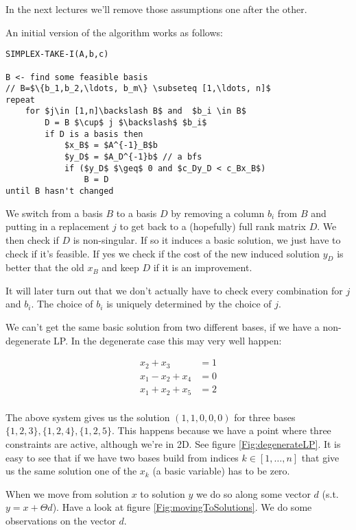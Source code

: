 In the next lectures we'll remove those assumptions one after the other.

An initial version of the algorithm works as follows:
\begin{lstlisting}
SIMPLEX-TAKE-I(A,b,c)

B <- find some feasible basis
// B=$\{b_1,b_2,\ldots, b_m\} \subseteq [1,\ldots, n]$
repeat 
    for $j\in [1,n]\backslash B$ and  $b_i \in B$
        D = B $\cup$ j $\backslash$ $b_i$
        if D is a basis then
            $x_B$ = $A^{-1}_B$b
            $y_D$ = $A_D^{-1}b$ // a bfs
            if ($y_D$ $\geq$ 0 and $c_Dy_D < c_Bx_B$)
                B = D
until B hasn't changed                
\end{lstlisting}

We switch from a basis $B$ to a basis $D$ by removing a column $b_i$ from $B$ and putting in a replacement $j$ to get back to a (hopefully) full rank matrix $D$. We then check if $D$ is non-singular. If so it induces a basic solution, we just have to check if it's feasible. If yes we check if the cost of the new induced solution $y_D$ is better that the old $x_B$ and keep $D$ if it is an improvement.

It will later turn out that we don't actually have to check every combination for $j$ and $b_i$. The choice of $b_i$ is uniquely determined by the choice of $j$.

We can't get the same basic solution from two different bases, if we have a non-degenerate LP. In the degenerate case this may very well happen:

\begin{align*}
x_2 + x_3 &= 1\\
x_1 - x_2 +x_4 &=0\\
x_1 + x_2 +x_5 &= 2\\
\end{align*}


The above system gives us the solution $(1,1,0,0,0)$ for three bases $\{1,2,3\},\{1,2,4\},\{1,2,5\}$. This happens because we have a point where three constraints are active, although we're in 2D. See figure \ref{Fig:degenerateLP}. It is easy to see that if we have two bases build from indices $k\in [1,\ldots,n]$ that give us the same solution one of the $x_k$ (a basic variable) has to be zero. %


When we move from solution $x$ to solution $y$ we do so along some vector $d$ (s.t. $y=x+\Theta d$). Have a look at figure \ref{Fig:movingToSolutions}. We do some observations on the vector $d$. 

